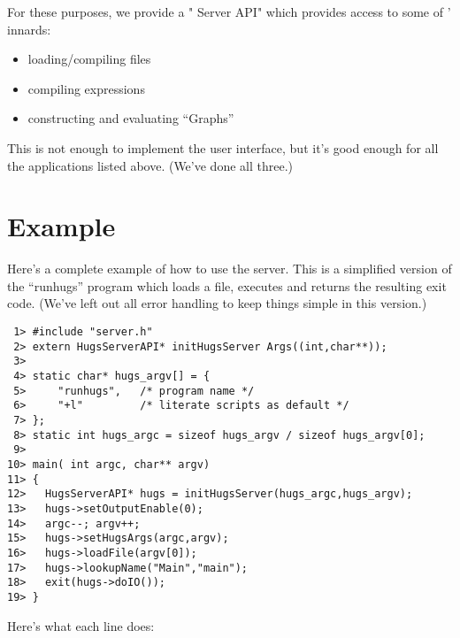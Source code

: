 For these purposes, we provide a "\Hugs{} Server API" which provides
access to some of \Hugs{}' innards:

\begin{itemize}
\item
 loading/compiling files
\item
 compiling expressions
\item
 constructing and evaluating ``Graphs''
\end{itemize}

This is not enough to implement the \Hugs{} user interface, but it's good
enough for all the applications listed above.  (We've done all three.)


\section{Example}\label{example}

Here's a complete example of how to use the \Hugs{} server.  This 
is a simplified version of the ``runhugs'' program which loads a 
file, executes  and returns the resulting exit code.
(We've left out all error handling to keep things simple in this
version.)

\begin{verbatim}
 1> #include "server.h"
 2> extern HugsServerAPI* initHugsServer Args((int,char**));
 3> 
 4> static char* hugs_argv[] = {
 5> 	"runhugs",   /* program name */
 6> 	"+l"         /* literate scripts as default */
 7> };
 8> static int hugs_argc = sizeof hugs_argv / sizeof hugs_argv[0];
 9> 
10> main( int argc, char** argv) 
11> {  
12>   HugsServerAPI* hugs = initHugsServer(hugs_argc,hugs_argv);     
13>   hugs->setOutputEnable(0);                                      
14>   argc--; argv++;                                                
15>   hugs->setHugsArgs(argc,argv);                                  
16>   hugs->loadFile(argv[0]);                                       
17>   hugs->lookupName("Main","main");                               
18>   exit(hugs->doIO());
19> }             
\end{verbatim}  

Here's what each line does:

